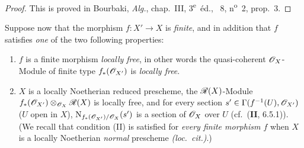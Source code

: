 \begin{proof}
This is proved in Bourbaki, \emph{Alg.}, chap.~III, 3\textsuperscript{e}~\'{e}d., \textsection~8, n\textsuperscript{o}~2, prop.~3.
\end{proof}

\begin{env}[21.5.3]
\label{IV.21.5.3}
Suppose now that the morphism $f:X'\to X$ is \emph{finite}, and in addition that $f$ satisfies \emph{one} of the two following properties:
\begin{enumerate}[label=\Roman*)]
  \item $f$ is a finite morphism \emph{locally free}, in other words  the quasi-coherent $\mathscr{O}_X$-Module of finite type $f_*(\mathscr{O}_{X'})$ is \emph{locally free}.
  \item $X$ is a locally Noetherian reduced prescheme, the $\mathscr{R}(X)$-Module $f_*(\mathscr{O}_{X'})\otimes_{\mathscr{O}_X}\mathscr{R}(X)$ is locally free, and for every section $s'\in\Gamma(f^{-1}(U),\mathscr{O}_{X'})$ ($U$ open
in $X$), $\mathrm{N}_{f_*(\mathscr{O}_{X'})/\mathscr{O}_X}(s')$ is a section of $\mathscr{O}_X$ over $U$ (cf.\ (\textbf{II}, 6.5.1)).
  (We recall that condition (II) is satisfied for \emph{every finite morphism $f$} when $X$ is a locally Noetherian \emph{normal} prescheme \emph{(loc.\ cit.)}.)
\end{enumerate}


\end{env}
